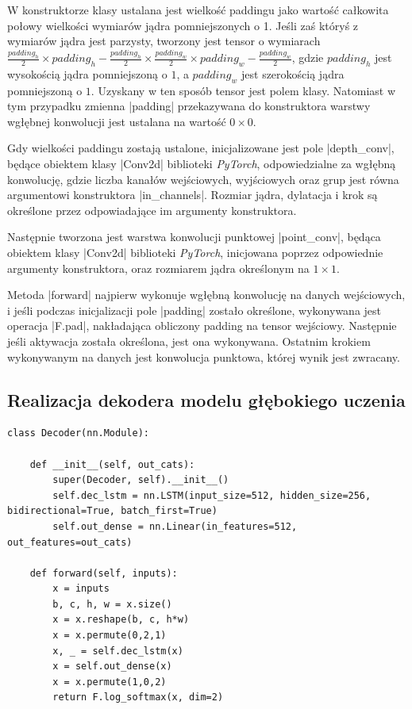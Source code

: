 W konstruktorze klasy ustalana jest wielkość paddingu jako wartość całkowita połowy wielkości wymiarów jądra pomniejszonych o 1. Jeśli zaś któryś z wymiarów jądra jest parzysty, tworzony jest tensor o wymiarach $\frac{padding_h}{2} \times padding_h - \frac{padding_h}{2} \times \frac{padding_w}{2} \times padding_w - \frac{padding_w}{2}$, gdzie $padding_h$ jest wysokością jądra pomniejszoną o $1$, a $padding_w$ jest szerokością jądra pomniejszoną o $1$. Uzyskany w ten sposób tensor jest polem klasy. Natomiast w tym przypadku zmienna \pyth|padding| przekazywana do konstruktora warstwy wgłębnej konwolucji jest ustalana na wartość $0 \times 0$.

Gdy wielkości paddingu zostają ustalone, inicjalizowane jest pole \pyth|depth_conv|, będące obiektem klasy \pyth|Conv2d| biblioteki \textit{PyTorch}, odpowiedzialne za wgłębną konwolucję, gdzie liczba kanałów wejściowych, wyjściowych oraz grup jest równa argumentowi konstruktora \pyth|in_channels|. Rozmiar jądra, dylatacja i krok są określone przez odpowiadające im argumenty konstruktora.

Następnie tworzona jest warstwa konwolucji punktowej \pyth|point_conv|, będąca obiektem klasy \pyth|Conv2d| biblioteki \textit{PyTorch}, inicjowana poprzez odpowiednie argumenty konstruktora, oraz rozmiarem jądra określonym na $1 \times 1$.

Metoda \pyth|forward| najpierw wykonuje wgłębną konwolucję na danych wejściowych, i jeśli podczas inicjalizacji pole \pyth|padding| zostało określone, wykonywana jest operacja \pyth|F.pad|, nakładająca obliczony padding na tensor wejściowy. Następnie jeśli aktywacja została określona, jest ona wykonywana. Ostatnim krokiem wykonywanym na danych jest konwolucja punktowa, której wynik jest zwracany.

\subsection{Realizacja dekodera modelu głębokiego uczenia} \label{Decoder}
\begin{lstlisting}[caption={\pyth|Decoder| - klasa dekodera modelu głębokiego uczenia.}, label={decoder}]
class Decoder(nn.Module):

	def __init__(self, out_cats):
		super(Decoder, self).__init__()
		self.dec_lstm = nn.LSTM(input_size=512, hidden_size=256, bidirectional=True, batch_first=True)
		self.out_dense = nn.Linear(in_features=512, out_features=out_cats)
	
	def forward(self, inputs):
		x = inputs
		b, c, h, w = x.size()
		x = x.reshape(b, c, h*w)
		x = x.permute(0,2,1)
		x, _ = self.dec_lstm(x)
		x = self.out_dense(x)
		x = x.permute(1,0,2)
		return F.log_softmax(x, dim=2)
\end{lstlisting}

